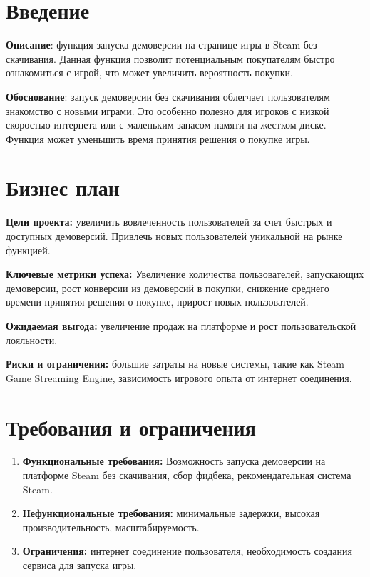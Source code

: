 \documentclass[12pt, a4paper]{article}
\begin{document}
\section*{Введение}
\justifying
\textbf{Описание}: функция запуска демоверсии на 
странице игры в Steam без скачивания. Данная функция 
позволит потенциальным покупателям быстро 
ознакомиться с игрой, что может увеличить 
вероятность покупки.
\par
\textbf{Обоснование}: запуск демоверсии без 
скачивания облегчает пользователям знакомство с 
новыми играми. Это особенно полезно для игроков с 
низкой скоростью интернета или с маленьким запасом
памяти на жестком диске. Функция может уменьшить
время принятия решения о покупке игры.

\newpage
\section{Бизнес план}
\textbf{Цели проекта: } увеличить вовлеченность
пользователей за счет быстрых и доступных демоверсий.
Привлечь новых пользователей уникальной на рынке
функцией. \par
\textbf{Ключевые метрики успеха: } Увеличение количества 
пользователей, запускающих демоверсии, рост конверсии из 
демоверсий в покупки, снижение среднего времени принятия 
решения о покупке, прирост новых пользователей. \par
\textbf{Ожидаемая выгода: } увеличение продаж на 
платформе и рост пользовательской лояльности.\par
\textbf{Риски и ограничения: } большие затраты на новые
системы, такие как Steam Game Streaming Engine,
зависимость игрового опыта от интернет соединения.



\section{Требования и ограничения}
\begin{enumerate}
	\item \textbf{Функциональные требования: } 
	Возможность запуска демоверсии на платформе Steam без 
	скачивания, сбор фидбека, рекомендательная система 
	Steam.
	\item \textbf{Нефункциональные требования: } 
	минимальные задержки, высокая производительность,
	масштабируемость.
	\item \textbf{Ограничения: } интернет соединение 
	пользователя, необходимость создания сервиса для
	запуска игры.
\end{enumerate}
\newpage
\end{document}
